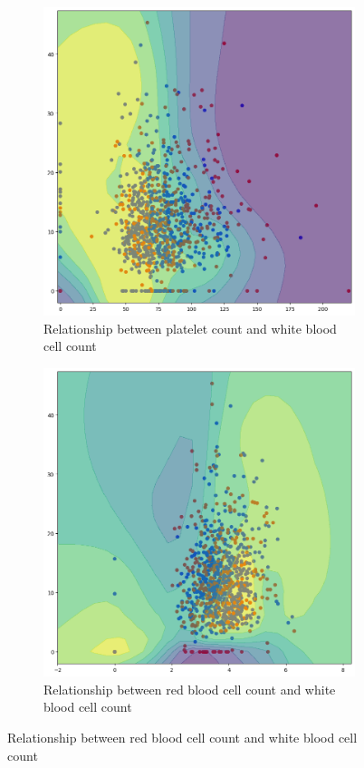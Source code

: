 \documentclass[../main.tex]{subfiles}
\begin{document}
\begin{figure}[H]
    \vfill

    \begin{subfigure}{0.45\textwidth}
        \centering
        \includegraphics[width=\linewidth]{Figure/plt-wbc.png}
        \caption{Relationship between platelet count and white blood cell count}
        \label{fig:tabpfn-plt-wbc}
    \end{subfigure}
    \hfill
    \begin{subfigure}{0.45\textwidth}
        \centering
        \includegraphics[width=\linewidth]{Figure/rbc-wbc.png}
        \caption{Relationship between red blood cell count and white blood cell count}
        \label{fig:tabpfn-rbc-wbc}
    \end{subfigure}
\end{figure}
\end{document}
